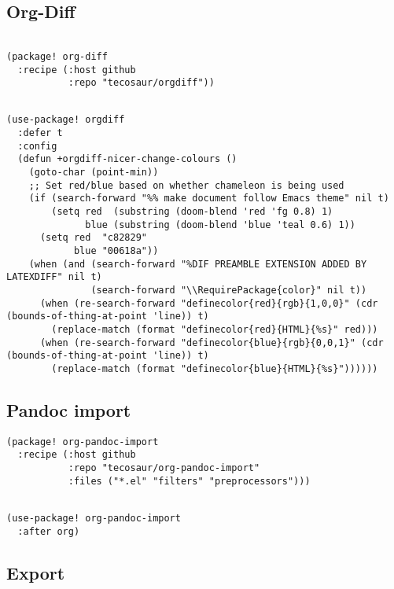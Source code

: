\documentclass[c]{article}
\theoremstyle{plain}%
\theoremstyle{definition}
\theoremstyle{remark}
\begin{document}
\subsection{Org-Diff}
\label{sec:org116d4c7}
\begin{verbatim}

(package! org-diff
  :recipe (:host github
           :repo "tecosaur/orgdiff"))
\end{verbatim}
\begin{verbatim}

(use-package! orgdiff
  :defer t
  :config
  (defun +orgdiff-nicer-change-colours ()
    (goto-char (point-min))
    ;; Set red/blue based on whether chameleon is being used
    (if (search-forward "%% make document follow Emacs theme" nil t)
        (setq red  (substring (doom-blend 'red 'fg 0.8) 1)
              blue (substring (doom-blend 'blue 'teal 0.6) 1))
      (setq red  "c82829"
            blue "00618a"))
    (when (and (search-forward "%DIF PREAMBLE EXTENSION ADDED BY LATEXDIFF" nil t)
               (search-forward "\\RequirePackage{color}" nil t))
      (when (re-search-forward "definecolor{red}{rgb}{1,0,0}" (cdr (bounds-of-thing-at-point 'line)) t)
        (replace-match (format "definecolor{red}{HTML}{%s}" red)))
      (when (re-search-forward "definecolor{blue}{rgb}{0,0,1}" (cdr (bounds-of-thing-at-point 'line)) t)
        (replace-match (format "definecolor{blue}{HTML}{%s}"))))))
\end{verbatim}
\subsection{Pandoc import}
\label{sec:orgb04730a}
\begin{verbatim}
(package! org-pandoc-import
  :recipe (:host github
           :repo "tecosaur/org-pandoc-import"
           :files ("*.el" "filters" "preprocessors")))
\end{verbatim}
\begin{verbatim}

(use-package! org-pandoc-import
  :after org)
\end{verbatim}
\subsection{Export}
\label{sec:org0eb03fc}
\end{document}

